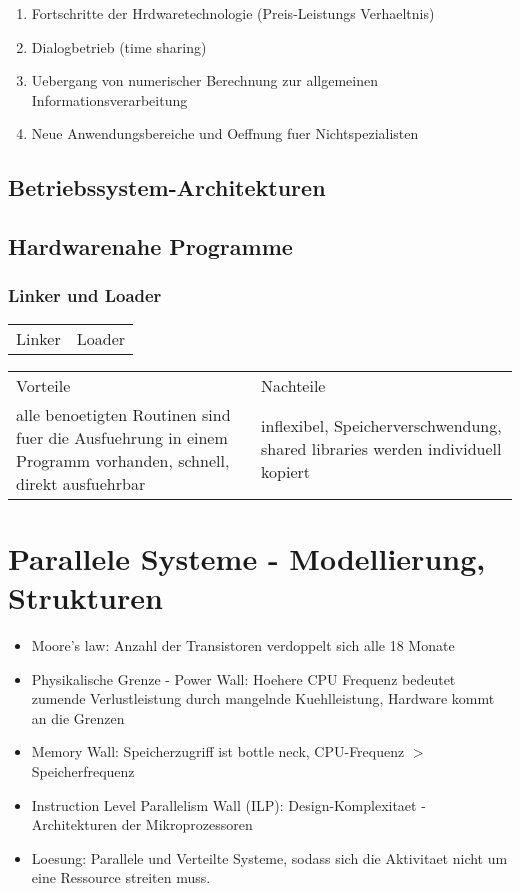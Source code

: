 \begin{enumerate}
	\setlength\itemsep{0em}
	\item Fortschritte der Hrdwaretechnologie (Preis-Leistungs Verhaeltnis)
	\item Dialogbetrieb (time sharing)
	\item Uebergang von numerischer Berechnung zur allgemeinen Informationsverarbeitung
	\item Neue Anwendungsbereiche und Oeffnung fuer Nichtspezialisten 
\end{enumerate}

\section{Betriebssystem-Architekturen}

\section{Hardwarenahe Programme}
\subsection{Linker und Loader}
\begin{tabularx}{\textwidth}{X X}
	Linker&			Loader \\
\end{tabularx}

\begin{tabularx}{\textwidth}{X X}
	Vorteile& Nachteile\\
	alle benoetigten Routinen sind fuer die Ausfuehrung in einem Programm vorhanden, schnell, direkt ausfuehrbar& inflexibel, Speicherverschwendung, shared libraries werden individuell kopiert\\ 
\end{tabularx}

\chapter{Parallele Systeme - Modellierung, Strukturen}
\begin{itemize}
	\setlength\itemsep{0em}
	\item Moore's law: Anzahl der Transistoren verdoppelt sich alle 18 Monate
	\item Physikalische Grenze - Power Wall: Hoehere CPU Frequenz bedeutet zumende Verlustleistung durch mangelnde Kuehlleistung, Hardware kommt an die Grenzen
	\item Memory Wall: Speicherzugriff ist bottle neck, CPU-Frequenz $>$ Speicherfrequenz
	\item Instruction Level Parallelism Wall (ILP): Design-Komplexitaet - Architekturen der Mikroprozessoren
	\item Loesung: Parallele und Verteilte Systeme, sodass sich die Aktivitaet nicht um eine Ressource streiten muss. 
\end{itemize}
